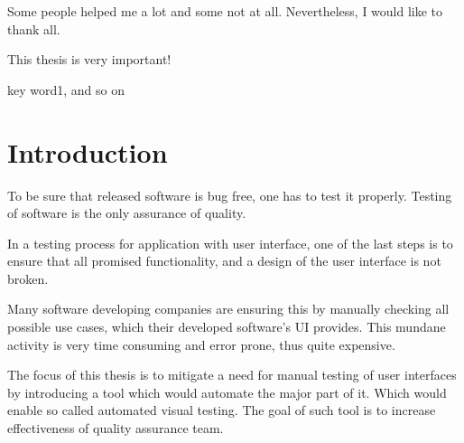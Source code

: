 \documentclass[11pt,oneside,final]{fithesis2}
\begin{document}
\newenvironment{atribut_description}
{\begin{description}
  \renewcommand{\makelabel}[1]{\texttt{\hspace{6pt}##1 $-$}}%
  \setlength{\itemsep}{1pt}
  \setlength{\parskip}{0pt}
  \setlength{\parsep}{0pt}}
{\end{description}}
\renewcommand{\tiny}{\fontsize{7.7}{9.7}\selectfont}

\FrontMatter
\ThesisTitlePage

\begin{ThesisDeclaration}
\DeclarationText
\AdvisorName
\end{ThesisDeclaration}

\begin{ThesisThanks}
Some people helped me a lot and some not at all. Nevertheless, I would like to thank all.
\end{ThesisThanks}

\begin{ThesisAbstract}
This thesis is very important!
\end{ThesisAbstract}
 
\begin{ThesisKeyWords}
key word1, and so on
\end{ThesisKeyWords}
\MainMatter



\renewcommand{\contentsname}{Table of contents}

\tableofcontents

\chapter{Introduction}    
To be sure that released software is bug free, one has to test it properly. Testing of software is the only
assurance of quality.

In a testing process for application with user interface, one of the last steps is to ensure that all 
promised functionality, and a design of the user interface is not broken.

Many software developing companies are ensuring this by manually checking all possible use cases, which
their developed software's UI provides. This mundane activity is very time consuming and error prone,
thus quite expensive.

The focus of this thesis is to mitigate a need for manual testing of user interfaces by introducing a tool
which would automate the major part of it. Which would enable so called automated visual testing. 
The goal of such tool is to increase effectiveness of quality assurance team.
\end{document}
